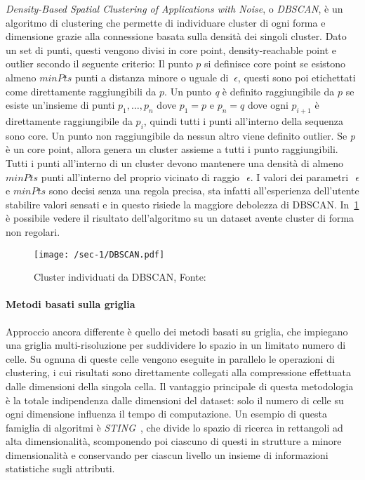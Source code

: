 \textit{Density-Based Spatial Clustering of Applications with Noise}, o \textit{DBSCAN}, è un algoritmo
di clustering che permette di individuare cluster di ogni forma e dimensione grazie alla connessione basata sulla densità dei singoli cluster.
Dato un set di punti, questi vengono divisi in core point, density-reachable point e outlier secondo il seguente criterio:
Il punto \(p\) si definisce core point se esistono almeno \(minPts\) punti a distanza minore o uguale di
\(~\epsilon \), questi sono poi etichettati come direttamente raggiungibili da \(p\).
Un punto \textit{q} è definito raggiungibile da \(p\) se esiste un'insieme di punti
\(p_{1},\ldots, p_{n}\) dove \(p_{1} = p \) e
\(p_{n} = q \) dove ogni \(p_{i + 1}\) è direttamente raggiungibile da
\(p_{i}\), quindi tutti i punti all'interno della sequenza sono core.
Un punto non raggiungibile da nessun altro viene definito outlier.
Se \textit{p} è un core point, allora genera un cluster assieme a tutti i punto raggiungibili.
Tutti i punti all'interno di un cluster devono mantenere una densità di almeno \(minPts\) punti all'interno del proprio vicinato di raggio~\(~\epsilon \).
I valori dei parametri~\(~\epsilon \) e \(minPts\) sono decisi senza una regola precisa, sta infatti all'esperienza dell'utente stabilire valori sensati e in questo risiede la maggiore debolezza di DBSCAN\@.
In~\cref*{fig:chap-1:dbscan-points} è possibile vedere 
il risultato dell'algoritmo su un dataset avente cluster
di forma non regolari.

\begin{figure}
  \centering
  \texttt{[image: /sec-1/DBSCAN.pdf]}
  \caption{Cluster individuati da DBSCAN, Fonte:~\cite{DBSCANWh86:online}}%
  \label{fig:chap-1:dbscan-points}
\end{figure}

\paragraph{Metodi basati sulla griglia}
Approccio ancora differente è quello dei metodi basati su griglia, che impiegano una griglia multi-risoluzione per suddividere lo spazio in un limitato numero di celle.
Su ognuna di queste celle vengono eseguite in parallelo le operazioni di clustering, i cui risultati sono direttamente collegati alla compressione
effettuata dalle dimensioni della singola cella.
Il vantaggio principale di questa metodologia è la totale indipendenza dalle dimensioni del dataset: solo il numero di
celle su ogni dimensione influenza il tempo di computazione.
Un esempio di questa famiglia di algoritmi è \textit{STING}~\cite{wang1997sting},
che divide lo spazio di ricerca in rettangoli ad alta dimensionalità, scomponendo poi ciascuno di questi
in strutture a minore dimensionalità e conservando per ciascun livello un insieme di informazioni statistiche sugli attributi.

